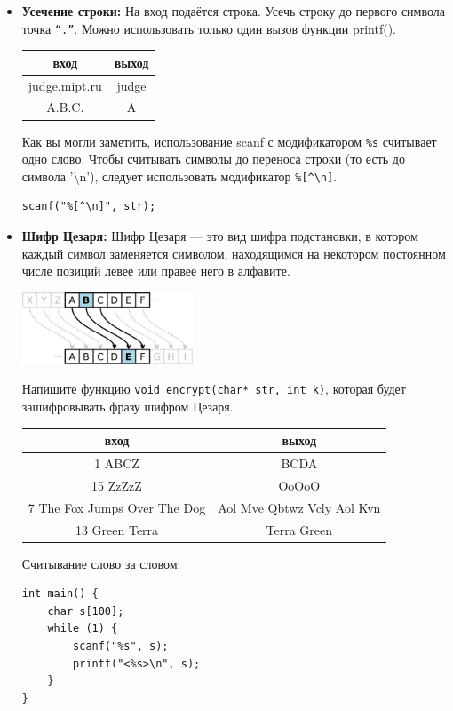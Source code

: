 \documentclass{article}
\begin{document}
\begin{itemize}
\item \textbf{Усечение строки:} На вход подаётся строка. Усечь строку до первого символа точка \texttt{``.''}. Можно использовать только один вызов функции printf().
\begin{center}
\begin{tabular}{ c | c }
 вход & выход \\ \hline
 judge.mipt.ru & judge \\
 A.B.C. & A  \\ 
\end{tabular}
\end{center}

Как вы могли заметить, использование scanf с модификатором \texttt{\%s} считывает одно слово. Чтобы считывать символы до переноса строки (то есть до символа '\textbackslash n'), следует использовать модификатор \verb|%[^\n]|.
\begin{lstlisting}
scanf("%[^\n]", str);
\end{lstlisting}

\item \textbf{Шифр Цезаря:} Шифр Цезаря — это вид шифра подстановки, в котором каждый символ заменяется символом, находящимся на некотором постоянном числе позиций левее или правее него в алфавите. 
\begin{center}
\includegraphics[width=0.4\textwidth]{caesar.png}
\end{center}
Напишите функцию \texttt{void encrypt(char* str, int k)}, которая будет зашифровывать фразу шифром Цезаря.
\begin{center}
\begin{tabular}{ c | c }
 вход & выход \\ \hline
 1 ABCZ & BCDA\\
 15 ZzZzZ & OoOoO \\
 7 The Fox Jumps Over The Dog & Aol Mve Qbtwz Vcly Aol Kvn \\
 13  Green Terra & Terra Green
\end{tabular}
\end{center}

Считывание слово за словом:
\begin{lstlisting}
int main() {
    char s[100];
    while (1) {
        scanf("%s", s);
        printf("<%s>\n", s);
    }
}
\end{lstlisting}


\end{itemize}
\end{document}
